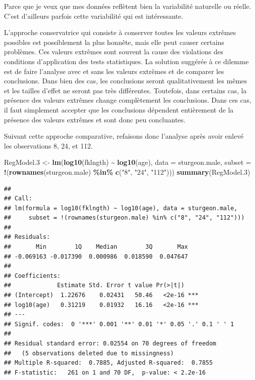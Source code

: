 \documentclass[
  12pt,
]{book}
\newenvironment{Shaded}{\begin{snugshade}}{\end{snugshade}}
\newcommand{\DataTypeTok}[1]{\textcolor[rgb]{0.13,0.29,0.53}{#1}}
\newcommand{\FloatTok}[1]{\textcolor[rgb]{0.00,0.00,0.81}{#1}}
\newcommand{\KeywordTok}[1]{\textcolor[rgb]{0.13,0.29,0.53}{\textbf{#1}}}
\newcommand{\NormalTok}[1]{#1}
\newcommand{\OperatorTok}[1]{\textcolor[rgb]{0.81,0.36,0.00}{\textbf{#1}}}
\newcommand{\StringTok}[1]{\textcolor[rgb]{0.31,0.60,0.02}{#1}}
\begin{document}
Parce que je veux que mes données reflètent bien la variabilité naturelle ou réelle. C'est d'ailleurs parfois cette variabilité qui est intéressante.

L'approche conservatrice qui consiste à conserver toutes les valeurs extrêmes possibles est possiblement la plus honnête, mais elle peut causer certains problèmes. Ces valeurs extrêmes sont souvent la cause des violations des conditions d'application des tests statistiques. La solution suggérée à ce dilemme est de faire l'analyse avec et sans les valeurs extrêmes et de comparer les conclusions. Dans bien des cas, les conclusions seront qualitativement les mêmes et les tailles d'effet ne seront pas très différentes. Toutefois, dans certains cas, la présence des valeurs extrêmes change complètement les conclusions. Dans ces cas, il faut simplement accepter que les conclusions dépendent entièrement de la présence des valeurs extrêmes et sont donc peu concluantes.

Suivant cette approche comparative, refaisons donc l'analyse après
avoir enlevé les observations 8, 24, et 112.

\begin{Shaded}
\begin{Highlighting}[]
\NormalTok{RegModel}\FloatTok{.3}\NormalTok{ \textless{}{-}}\StringTok{ }\KeywordTok{lm}\NormalTok{(}\KeywordTok{log10}\NormalTok{(fklngth) }\OperatorTok{\textasciitilde{}}\StringTok{ }\KeywordTok{log10}\NormalTok{(age), }\DataTypeTok{data =}\NormalTok{ sturgeon.male, }\DataTypeTok{subset =} \OperatorTok{!}\NormalTok{(}\KeywordTok{rownames}\NormalTok{(sturgeon.male) }\OperatorTok{\%in\%}\StringTok{ }\KeywordTok{c}\NormalTok{(}\StringTok{"8"}\NormalTok{, }\StringTok{"24"}\NormalTok{, }\StringTok{"112"}\NormalTok{)))}
\KeywordTok{summary}\NormalTok{(RegModel}\FloatTok{.3}\NormalTok{)}
\end{Highlighting}
\end{Shaded}

\begin{verbatim}
## 
## Call:
## lm(formula = log10(fklngth) ~ log10(age), data = sturgeon.male, 
##     subset = !(rownames(sturgeon.male) %in% c("8", "24", "112")))
## 
## Residuals:
##       Min        1Q    Median        3Q       Max 
## -0.069163 -0.017390  0.000986  0.018590  0.047647 
## 
## Coefficients:
##             Estimate Std. Error t value Pr(>|t|)    
## (Intercept)  1.22676    0.02431   50.46   <2e-16 ***
## log10(age)   0.31219    0.01932   16.16   <2e-16 ***
## ---
## Signif. codes:  0 '***' 0.001 '**' 0.01 '*' 0.05 '.' 0.1 ' ' 1
## 
## Residual standard error: 0.02554 on 70 degrees of freedom
##   (5 observations deleted due to missingness)
## Multiple R-squared:  0.7885, Adjusted R-squared:  0.7855 
## F-statistic:   261 on 1 and 70 DF,  p-value: < 2.2e-16
\end{verbatim}
\end{document}
